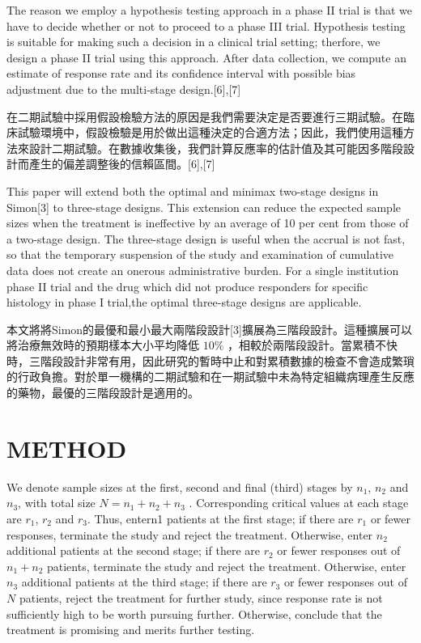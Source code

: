 The reason we employ a hypothesis testing approach in a phase II trial is that we have to decide whether or not to proceed to a phase III trial. Hypothesis testing is suitable for making such a decision in a clinical trial setting; therfore, we design a phase II trial using this approach. After data collection, we compute an estimate of response rate and its confidence interval with possible bias adjustment due to the multi-stage design.[6],[7]

在二期試驗中採用假設檢驗方法的原因是我們需要決定是否要進行三期試驗。在臨床試驗環境中，假設檢驗是用於做出這種決定的合適方法；因此，我們使用這種方法來設計二期試驗。在數據收集後，我們計算反應率的估計值及其可能因多階段設計而產生的偏差調整後的信賴區間。[6],[7]

This paper will extend both the optimal and minimax two-stage designs in Simon[3] to three-stage designs. This extension can reduce the expected sample sizes when the treatment is ineffective by an average of 10 per cent from those of a two-stage design. The three-stage design is useful when the accrual is not fast, so that the temporary suspension of the study and examination of cumulative data does not create an onerous administrative burden. For a single institution phase II trial and the drug which did not produce responders for specific histology in phase I trial,the optimal three-stage designs are applicable.

本文將將Simon的最優和最小最大兩階段設計[3]擴展為三階段設計。這種擴展可以將治療無效時的預期樣本大小平均降低 $10\%$ ，相較於兩階段設計。當累積不快時，三階段設計非常有用，因此研究的暫時中止和對累積數據的檢查不會造成繁瑣的行政負擔。對於單一機構的二期試驗和在一期試驗中未為特定組織病理產生反應的藥物，最優的三階段設計是適用的。
\section{METHOD}
We denote sample sizes at the first, second and final (third) stages by $n_1$, $n_2$ and $n_3$, with total size $N=n_1+n_2+n_3$ . Corresponding critical values at each stage are $r_1$, $r_2$ and $r_3$. Thus, entern1 patients at the first stage; if there are $r_1$ or fewer responses, terminate the study and reject the treatment. Otherwise, enter $n_2$ additional patients at the second stage; if there are $r_2$ or fewer responses out of $n_1+n_2$ patients, terminate the study and reject the treatment. Otherwise, enter $n_3$ additional patients at the third stage; if there are $r_3$ or fewer responses out of $N$ patients, reject the treatment for further study, since response rate is not sufficiently high to be worth pursuing further. Otherwise, conclude that the treatment is promising and merits further testing.

